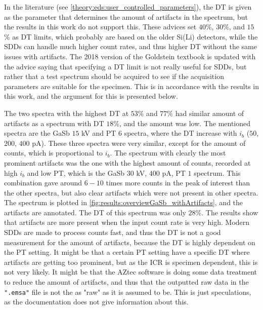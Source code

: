 In the literature \cite{astm_e1508_eds_quantification,iso_quantification_22309,newbury_deadtime_2014} (see \cref{theory:eds:user_controlled_parameters}), the DT is given as the parameter that determines the amount of artifacts in the spectrum, but the results in this work do not support this.
These advices set $40$\%, $30$\%, and $15$\% as DT limits, which probably are based on the older Si(Li) detectors, while the SDDs can handle much higher count rates, and thus higher DT without the same issues with artifacts.
The 2018 version of the Goldstein textbook \cite{goldstein_scanning_2018} is updated with the advice saying that specifying a DT limit is not really useful for SDDs, but rather that a test spectrum should be acquired to see if the acquisition parameters are suitable for the specimen.
This is in accordance with the results in this work, and the argument for this is presented below.

The two spectra with the highest DT at $53$\% and $77$\% had similar amount of artifacts as a spectrum with DT $18$\%, and the amount was low.
The mentioned spectra are the GaSb $15$ kV and PT $6$ spectra, where the DT increase with $i_b$ ($50$, $200$, $400$ pA).
These three spectra were very similar, except for the amount of counts, which is proportional to $i_b$.
The spectrum with clearly the most prominent artifacts was the one with the highest amount of counts, recorded at high $i_b$ and low PT, which is the GaSb $30$ kV, $400$ pA, PT $1$ spectrum.
This combination gave around $6-10$ times more counts in the peak of interest than the other spectra, but also clear artifacts which were not present in other spectra.
The spectrum is plotted in \cref{fig:results:overviewGaSb_withArtifacts}, and the artifacts are annotated.
The DT of this spectrum was only $28$\%.
The results show that artifacts are more present when the input count rate is very high.
Modern SDDs are made to process counts fast, and thus the DT is not a good measurement for the amount of artifacts, because the DT is highly dependent on the PT setting. 
It might be that a certain PT setting have a specific DT where artifacts are getting too prominent, but as the ICR is specimen dependent, this is not very likely.
It might be that the AZtec software is doing some data treatment to reduce the amount of artifacts, and thus that the outputted raw data in the \verb|".emsa"| file is not the as "raw" as it is assumed to be.
This is just speculations, as the documentation \cite{aztec_manual} does not give information about this.


